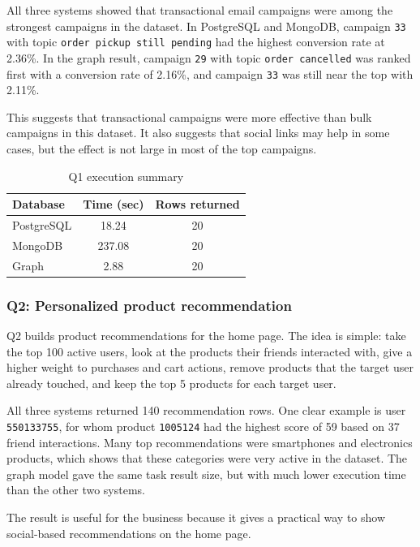 \documentclass[11pt,a4paper]{article}
\begin{document}
All three systems showed that transactional email campaigns were among the strongest campaigns in the dataset. In PostgreSQL and MongoDB, campaign \texttt{33} with topic \texttt{order pickup still pending} had the highest conversion rate at 2.36\%. In the graph result, campaign \texttt{29} with topic \texttt{order cancelled} was ranked first with a conversion rate of 2.16\%, and campaign \texttt{33} was still near the top with 2.11\%.

This suggests that transactional campaigns were more effective than bulk campaigns in this dataset. It also suggests that social links may help in some cases, but the effect is not large in most of the top campaigns.

\begin{table}[htbp]
    \centering
    \caption{Q1 execution summary}
    \begin{tabular}{lcc}
        \hline
        Database & Time (sec) & Rows returned \\
        \hline
        PostgreSQL & 18.24 & 20 \\
        MongoDB & 237.08 & 20 \\
        Graph & 2.88 & 20 \\
        \hline
    \end{tabular}
\end{table}

\subsubsection{Q2: Personalized product recommendation}
Q2 builds product recommendations for the home page. The idea is simple: take the top 100 active users, look at the products their friends interacted with, give a higher weight to purchases and cart actions, remove products that the target user already touched, and keep the top 5 products for each target user.

All three systems returned 140 recommendation rows. One clear example is user \texttt{550133755}, for whom product \texttt{1005124} had the highest score of 59 based on 37 friend interactions. Many top recommendations were smartphones and electronics products, which shows that these categories were very active in the dataset. The graph model gave the same task result size, but with much lower execution time than the other two systems.

The result is useful for the business because it gives a practical way to show social-based recommendations on the home page.
\end{document}

